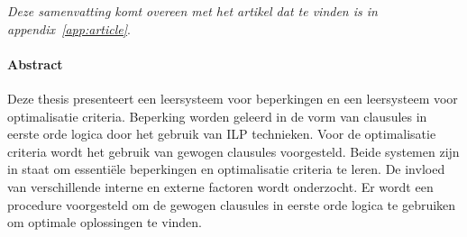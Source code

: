 \documentclass[master=cws,masteroption=ai,english]{kulemt}
\theoremstyle{definition}
\begin{document}
\begin{abstract*}

\textit{Deze samenvatting komt overeen met het artikel dat te vinden is in appendix~\ref{app:article}}.

\paragraph{Abstract}
Deze thesis presenteert een leersysteem voor beperkingen en een leersysteem voor optimalisatie criteria.
Beperking worden geleerd in de vorm van clausules in eerste orde logica door het gebruik van ILP technieken.
Voor de optimalisatie criteria wordt het gebruik van gewogen clausules voorgesteld.
Beide systemen zijn in staat om essenti\"ele beperkingen en optimalisatie criteria te leren.
De invloed van verschillende interne en externe factoren wordt onderzocht.
Er wordt een procedure voorgesteld om de gewogen clausules in eerste orde logica te gebruiken om optimale oplossingen te vinden.


\end{abstract*}

\listoffiguresandtables

\mainmatter















%


%
%

\appendix






\backmatter


\end{document}
